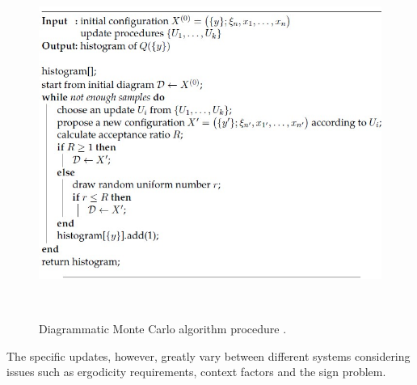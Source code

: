 \begin{figure}[H]
    \centering
    \includegraphics[scale=0.8]{Diag_MC_algo.jpg}
    \caption{Diagrammatic Monte Carlo algorithm procedure \cite{HahnThomas2017DqMC}.}\
    \label{fig:diag_MC_algo}
\end{figure}
The specific updates, however, greatly vary between different systems considering issues such as ergodicity requirements, context factors and the sign problem.
